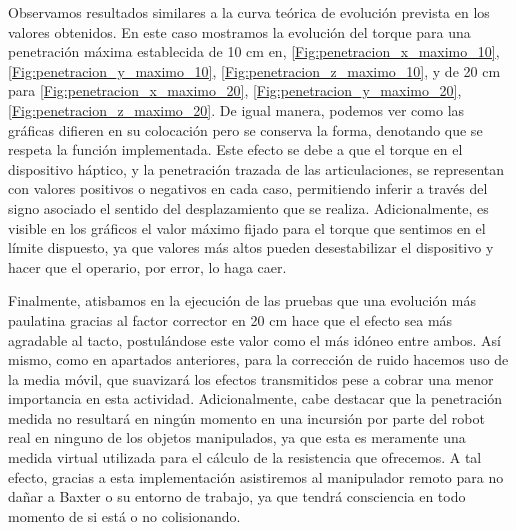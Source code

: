 Observamos resultados similares a la curva teórica de evolución prevista en los valores obtenidos. En este caso mostramos la evolución del torque para una penetración máxima establecida de 10 cm en, \ref{Fig:penetracion_x_maximo_10},  \ref{Fig:penetracion_y_maximo_10},  \ref{Fig:penetracion_z_maximo_10}, y de 20 cm para \ref{Fig:penetracion_x_maximo_20},  \ref{Fig:penetracion_y_maximo_20},  \ref{Fig:penetracion_z_maximo_20}. De igual manera, podemos ver como las gráficas difieren en su colocación pero se conserva la forma, denotando que se respeta la función implementada. Este efecto se debe a que el torque en el dispositivo háptico, y la penetración trazada de las articulaciones, se representan con valores positivos o negativos en cada caso, permitiendo inferir a través del signo asociado el sentido del desplazamiento que se realiza. Adicionalmente, es visible en los gráficos el valor máximo fijado para el torque que sentimos en el límite dispuesto, ya que valores más altos pueden desestabilizar el dispositivo y hacer que el operario, por error, lo haga caer.

Finalmente, atisbamos en la ejecución de las pruebas que una evolución más paulatina gracias al factor corrector en 20 cm hace que el efecto sea más agradable al tacto, postulándose este valor como el más idóneo entre ambos. Así mismo, como en apartados anteriores, para la corrección de ruido hacemos uso de la media móvil, que suavizará los efectos transmitidos pese a cobrar una menor importancia en esta actividad. Adicionalmente, cabe destacar que la penetración medida no resultará en ningún momento en una incursión por parte del robot real en ninguno de los objetos manipulados, ya que esta es meramente una medida virtual utilizada para el cálculo de la resistencia que ofrecemos. A tal efecto, gracias a esta implementación asistiremos al manipulador remoto para no dañar a Baxter o su entorno de trabajo, ya que tendrá consciencia en todo momento de si está o no colisionando.

